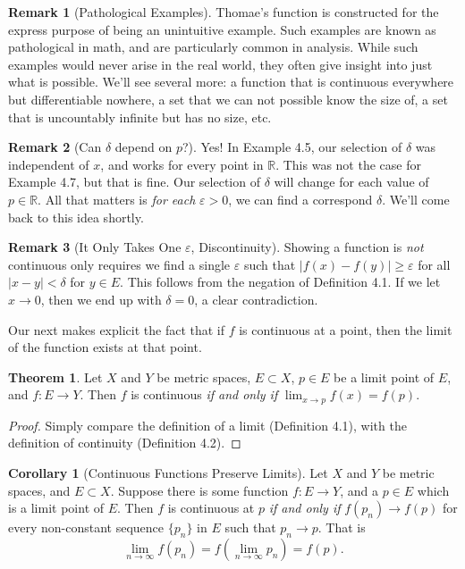 \documentclass{article}
\newcommand{\R}{\mathbb{R}}
\theoremstyle{definition}
\newtheorem{theorem}{Theorem}[section]
\newtheorem{corollary}{Corollary}[section]
\newtheorem{remark}{Remark}[section]
\begin{document}
	\begin{remark}[Pathological Examples]
		Thomae's function is constructed for the express purpose of being an unintuitive example. Such examples are known as pathological in math, and are particularly common in analysis. While such examples would never arise in the real world, they often give insight into just what is possible. We'll see several more: a function that is continuous everywhere but differentiable nowhere, a set that we can not possible know the size of, a set that is uncountably infinite but has no size, etc. 
	\end{remark}
	\begin{remark}[Can $\delta  $ depend on $p $?]
		Yes! In Example 4.5, our selection of $ \delta $ was independent of $ x $, and works for every point in $ \R $. This was not the case for Example 4.7, but that is fine. Our selection of $ \delta $ will change for each value of $ p\in\R $. All that matters is \textit{for each} $ \varepsilon>0 $, we can find a correspond $ \delta $. We'll come back to this idea shortly.  
	\end{remark}
	\begin{remark}[It Only Takes One $ \varepsilon $, Discontinuity]
		Showing a function is \textit{not} continuous only requires we find a single $ \varepsilon $ such that $ |f(x)-f(y)|\ge\varepsilon $ for all $ |x-y|<\delta $ for $ y\in E $. This follows from the negation of Definition 4.1. If we let $ x\to0 $, then we end up with $ \delta=0 $, a clear contradiction. 
	\end{remark}
	Our next makes explicit the fact that if $ f $ is continuous at a point, then the limit of the function exists at that point.
	\begin{theorem}
		Let $ X $ and $ Y $ be metric spaces,  $ E\subset X $, $ p \in E $ be a limit point of $ E $, and $ f:E\to Y $. Then $ f $ is continuous \textit{if and only if} $ \lim_{x\to p}f(x)=f(p) $.
	\end{theorem}
	\begin{proof}
		Simply compare the definition of a limit (Definition 4.1), with the definition of continuity (Definition 4.2).
	\end{proof}
	\begin{corollary}[Continuous Functions Preserve Limits]
		Let $ X $ and $ Y $ be metric spaces, and $ E\subset X $. Suppose there is some function $ f:E\to Y $, and a $ p\in E $ which is a limit point of $ E $. Then $ f $ is continuous at $ p $ \textit{if and only if} $ f(p_n)\to f(p) $ for every non-constant sequence $ \{p_n\} $ in $ E $ such that $ p_n\to p $. That is $$\lim\limits_{n\to \infty}f(p_n)=f\left(\lim\limits_{n\to\infty} p_n\right)=f(p) .$$
	\end{corollary}
\end{document}
